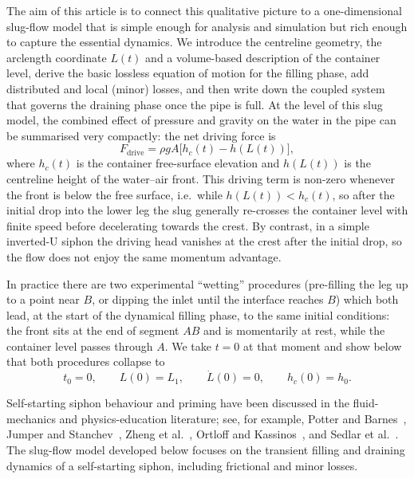 \documentclass[11pt]{article}
\begin{document}
The aim of this article is to connect this qualitative picture to a one-dimensional slug-flow
model that is simple enough for analysis and simulation but rich enough to capture the
essential dynamics. We introduce the centreline geometry, the arclength coordinate $L(t)$
and a volume-based description of the container level, derive the basic lossless equation
of motion for the filling phase, add distributed and local (minor) losses, and then write
down the coupled system that governs the draining phase once the pipe is full.
At the level of this slug model, the combined effect of pressure and gravity on the water in
the pipe can be summarised very compactly: the net driving force is
\begin{equation}
  F_{\text{drive}} = \rho g A\bigl[h_c(t) - h(L(t))\bigr],
  \label{eq:Fdrive}
\end{equation}
where $h_c(t)$ is the container free-surface elevation and $h(L(t))$ is the centreline height
of the water--air front. This driving term is non-zero whenever the front is below the free
surface, i.e.\ while $h(L(t))<h_c(t)$, so after the initial drop into the lower leg the slug
generally re-crosses the container level with finite speed before decelerating towards the
crest. By contrast, in a simple inverted-U siphon the driving head vanishes at the crest
after the initial drop, so the flow does not enjoy the same momentum advantage.

In practice there are two experimental ``wetting'' procedures (pre-filling the leg up to a point
near $B$, or dipping the inlet until the interface reaches $B$) which both lead, at the start
of the dynamical filling phase, to the same initial conditions: the front sits at the end of
segment $AB$ and is momentarily at rest, while the container level passes through $A$.
We take $t=0$ at that moment and show below that both procedures collapse to
\[
  t_0 = 0,\qquad L(0) = L_1,\qquad \dot L(0) = 0,\qquad h_c(0) = h_0.
\]

Self-starting siphon behaviour and priming have been discussed in the fluid-mechanics and
physics-education literature; see, for example, Potter and Barnes~\cite{potter_barnes}, Jumper and Stanchev~\cite{jumper_stanchev},
Zheng et al.~\cite{zheng_siphon}, Ortloff and Kassinos~\cite{ortloff_kassinos}, and Sedlar et al.~\cite{sedlar_siphon}.
The slug-flow model developed below focuses on the transient filling and draining dynamics
of a self-starting siphon, including frictional and minor losses.
\end{document}
